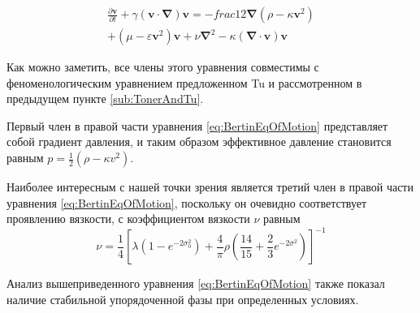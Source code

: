 		\begin{multline}
		\label{eq:BertinEqOfMotion}
			\frac{\partial \boldsymbol{v}}{\partial t} + \gamma(\boldsymbol{v} \cdot \boldsymbol{\nabla}) \boldsymbol{v} = -frac{1}{2} \boldsymbol{\nabla} (\rho - \kappa \boldsymbol{v}^2) \\ + (\mu - \varepsilon \boldsymbol{v}^2) \boldsymbol{v} + \nu \boldsymbol{\nabla}^2 - \kappa (\boldsymbol{\nabla} \cdot \boldsymbol{v}) \boldsymbol{v}
		\end{multline}

		Как можно заметить, все члены этого уравнения совместимы с феноменологическим уравнением предложенном Tu и рассмотренном в предыдущем пункте \ref{sub:TonerAndTu}.

		Первый член в правой части уравнения \ref{eq:BertinEqOfMotion} представляет собой градиент давления, и таким образом эффективное давление становится равным $p = \frac{1}{2}(\rho - \kappa v^2)$.

		Наиболее интересным с нашей точки зрения является третий член в правой части уравнения \ref{eq:BertinEqOfMotion}, поскольку он очевидно соответствует проявлению вязкости, с коэффициентом вязкости $\nu$ равным
		\begin{equation}
		\label{eq:BertinViscosityCoefficient}
			\nu = \frac{1}{4}[\lambda (1-e^{-2 \sigma_0^2}) + \frac{4}{\pi}\rho(\frac{14}{15} + \frac{2}{3}e^{-2 \sigma^2})]^{-1}
		\end{equation}

		Анализ вышеприведенного уравнения \ref{eq:BertinEqOfMotion} также показал наличие стабильной упорядоченной фазы при определенных условиях.

